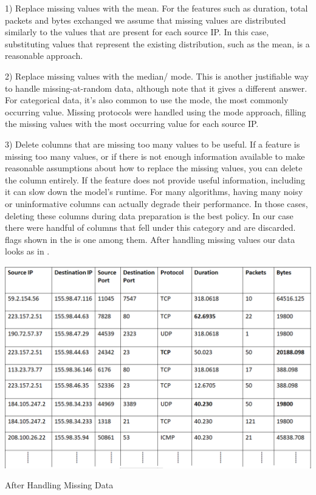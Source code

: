 1) Replace missing values with the mean. For the features such as duration, total packets and bytes exchanged we assume that missing values are distributed similarly to the values that are present for each source IP. In this case, substituting values that represent the existing distribution, such as the mean, is a reasonable approach. 

2) Replace missing values with the median/ mode. This is another justifiable way to handle missing-at-random data, although note that it gives a different answer. For categorical data, it's also common to use the mode, the most commonly occurring value. Missing protocols were handled using the mode approach, filling the missing values with the most occurring value for each source IP.

3) Delete columns that are missing too many values to be useful. If a feature is missing too many values, or if there is not enough information available to make reasonable assumptions about how to replace the missing values, you can delete the column entirely. If the feature does not provide useful information, including it can slow down the model's runtime. For many algorithms, having many noisy or uninformative columns can actually degrade their performance. In those cases, deleting these columns during data preparation is the best policy. In our case there were handful of columns that fell under this category and are discarded. flags shown in the  is one among them. After handling missing values our data looks as in .

\begin{table}[ht]
	\centerline{\includegraphics[scale = 0.6]{missing_data.png}}
	\caption{After Handling Missing Data}%
\end{table}


